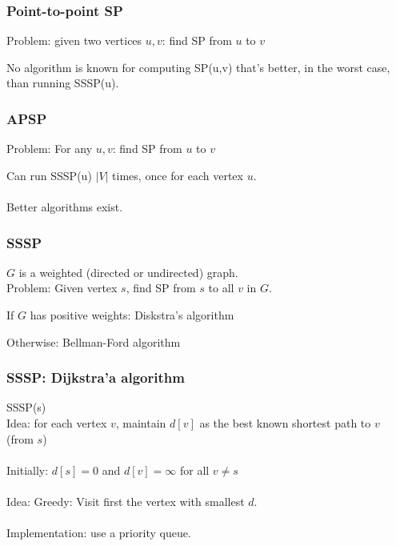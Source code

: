   \begin{frame}[fragile]
  \frametitle{Point-to-point SP}

  Problem:   given two vertices $u,v$: find SP from $u$ to $v$ 


  No algorithm is known for computing SP(u,v) that's better, in the
  worst case, than running SSSP(u).
\end{frame} 



  \begin{frame}[fragile]
  \frametitle{APSP}

  Problem:   For any $u,v$: find SP from $u$ to $v$ 


Can run SSSP(u) $|V|$ times, once  for each vertex $u$. 
~\\~\\
Better algorithms exist. 
\end{frame} 



  \begin{frame}[fragile]
  \frametitle{SSSP}

  $G$ is a weighted (directed or undirected) graph. \\
  Problem: Given vertex $s$, find SP from $s$ to all $v$ in $G$.  

  
  If $G$ has positive weights: Diskstra's algorithm 

  Otherwise: Bellman-Ford algorithm 
\end{frame}



  \begin{frame}[fragile]
  \frametitle{SSSP: Dijkstra'a algorithm}
SSSP(s)\\
Idea: for each vertex $v$, maintain $d[v]$ as the best known shortest path to $v$ (from $s$)\\
~\\
Initially: $d[s]=0$ and  $d[v] = \infty$ for all $v \neq s$\\
~\\
Idea:  Greedy: Visit first the vertex with smallest $d$.  ~\\
~\\
Implementation: use a priority queue. \\
\end{frame}


